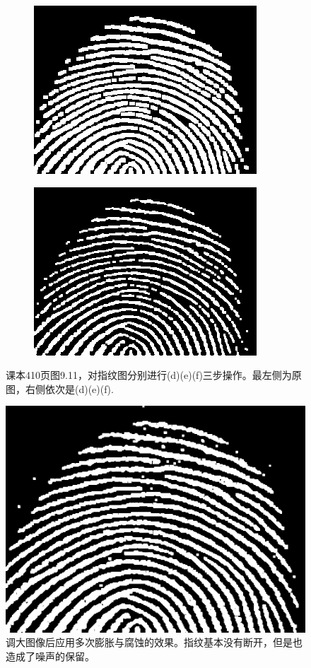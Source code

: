 \documentclass{article}
\begin{document}
\begin{figure}[htbp]
\begin{subfigure}{.22\textwidth}
        \includegraphics[width=\linewidth]{img/job1-e.png}
    \end{subfigure}
    \begin{subfigure}{.22\textwidth}
        \includegraphics[width=\linewidth]{img/job1-f.png}
    \end{subfigure}
    \caption{课本410页图9.11，对指纹图分别进行(d)(e)(f)三步操作。最左侧为原图，右侧依次是(d)(e)(f).}
\end{figure}

\begin{figure}[htbp]
    \centering
    \includegraphics[width=0.3\linewidth]{img/connect.png}
    \caption{调大图像后应用多次膨胀与腐蚀的效果。指纹基本没有断开，但是也造成了噪声的保留。}
\end{figure}
\end{document}
